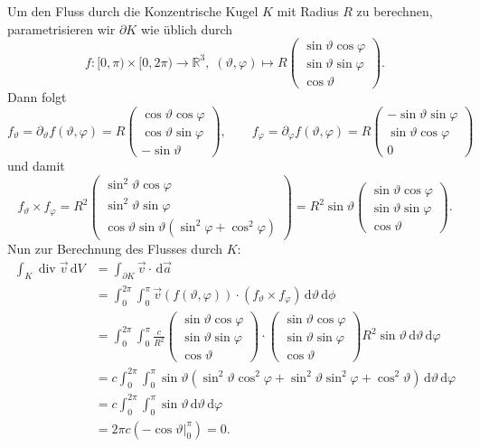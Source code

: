 \documentclass[11pt]{article}
\theoremstyle{plain}
\theoremstyle{definition}
\theoremstyle{remark}
\newcommand{\R}{\mathbb{R}}
\renewcommand{\d}{\,\mathrm{d}}
\newcommand{\ph}{\varphi}
\renewcommand{\th}{\vartheta}
\renewcommand{\div}{\operatorname{div}}
\begin{document}
Um den Fluss durch die Konzentrische Kugel $K$ mit Radius $R$ zu berechnen, parametrisieren wir $\partial K$ wie üblich durch 
\[ f: [0, \pi) \times [0, 2\pi) \longrightarrow \R^3, \; (\th, \ph) \longmapsto R \begin{pmatrix}
\sin\th \cos\ph \\ \sin\th \sin \ph \\ \cos\th
\end{pmatrix}. \]
Dann folgt
\[ f_\th = \partial_\th f(\th, \ph) = R \begin{pmatrix}
\cos\th \cos\ph \\ \cos\th \sin\ph \\ -\sin\th
\end{pmatrix}, 
\qquad f_\ph = \partial_\ph f(\th, \ph) = R \begin{pmatrix}
-\sin\th \sin\ph \\ \sin\th \cos\ph \\ 0
\end{pmatrix} \]
und damit
\[ f_\th \times f_\ph = R^2 \begin{pmatrix}
\sin^2 \th \cos\ph \\ \sin^2 \th \sin\ph \\ \cos\th \sin\th(\sin^2 \ph + \cos^2 \ph)
\end{pmatrix}
= R^2 \sin\th \begin{pmatrix}
\sin\th \cos\ph \\ \sin\th \sin \ph \\ \cos\th
\end{pmatrix}. \]
Nun zur Berechnung des Flusses durch $K$:
\begin{align*}
\int_K \div \vec v \d V &= \int_{\partial K} \vec v \cdot \d \vec a \\
&= \int_{0}^{2\pi} \int_{0}^{\pi} \vec v(f(\th, \ph)) \cdot (f_\th \times f_\ph) \d \th \d \phi\\
&= \int_{0}^{2\pi} \int_{0}^{\pi} \frac{c}{R^2} \begin{pmatrix}
\sin\th \cos\ph \\ \sin\th \sin \ph \\ \cos\th
\end{pmatrix} \cdot \begin{pmatrix}
\sin\th \cos\ph \\ \sin\th \sin \ph \\ \cos\th
\end{pmatrix} R^2 \sin\th \d\th \d\ph \\
&= c \int_{0}^{2\pi} \int_{0}^{\pi} \sin\th (\sin^2 \th \cos^2 \ph +  \sin^2 \th \sin^2 \ph + \cos^2 \th) \d\th \d\ph \\
&= c \int_{0}^{2\pi} \int_{0}^{\pi} \sin\th \d\th \d\ph \\
&= 2\pi c (-\cos\th\vert_0^\pi) = 0.
\end{align*}
\end{document}
